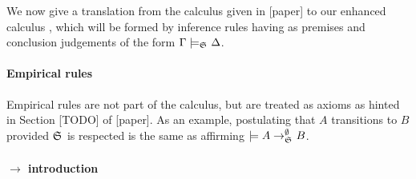 

We now give a translation from the calculus \znd{} given in [paper] to our
enhanced calculus \eznd{}, which will be formed by inference rules having as
premises and conclusion judgements of the form
$\Gamma \models_{\mathfrak{S}_{}} \Delta$.

\paragraph{Empirical rules}

Empirical rules are not part of the calculus, but are treated as axioms as
hinted in Section [TODO] of [paper]. As an example, postulating that $A$
transitions to $B$ provided $\mathfrak{S}_{}$ is respected is the same as affirming
$\models A \rightarrow_{\mathfrak{S}_{}}^\emptyset B$.

\paragraph{$\rightarrow$ introduction}

